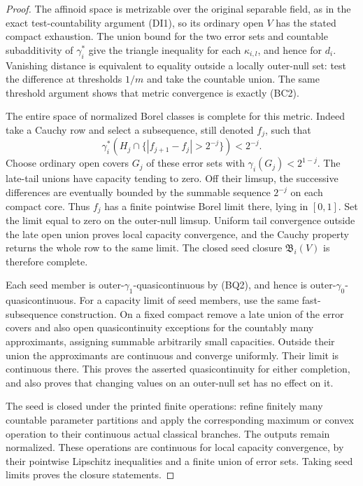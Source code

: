 \begin{proof}
The affinoid space is metrizable over the original separable
field, as in the exact test-countability argument (DI1), so its
ordinary open $V$ has the stated compact exhaustion. The union
bound for the two error sets and countable subadditivity of
$\gamma_i^*$ give the triangle inequality for each
$\kappa_{i,l}$, and hence for $d_i$. Vanishing distance is
equivalent to equality outside a locally outer-null set: test
the difference at thresholds $1/m$ and take the countable union.
The same threshold argument shows that metric convergence is
exactly (BC2).

The entire space of normalized Borel classes is complete for
this metric. Indeed take a Cauchy row and select a subsequence,
still denoted $f_j$, such that
\[
 \gamma_i^*(H_j\cap\{|f_{j+1}-f_j|>2^{-j}\})<2^{-j}.
\]
Choose ordinary open covers $G_j$ of these error sets with
$\gamma_i(G_j)<2^{1-j}$. The late-tail unions have capacity
tending to zero. Off their limsup, the successive differences
are eventually bounded by the summable sequence $2^{-j}$ on
each compact core. Thus $f_j$ has a finite pointwise Borel
limit there, lying in $[0,1]$. Set the limit equal to zero on
the outer-null limsup. Uniform tail convergence outside the
late open union proves local capacity convergence, and the
Cauchy property returns the whole row to the same limit.
The closed seed closure $\mathfrak B_i(V)$ is therefore complete.

Each seed member is outer-$\gamma_1$-quasicontinuous by (BQ2),
and hence is outer-$\gamma_0$-quasicontinuous. For a capacity
limit of seed members, use the same fast-subsequence construction.
On a fixed compact remove a late union of the error covers and
also open quasicontinuity exceptions for the countably many
approximants, assigning summable arbitrarily small capacities.
Outside their union the approximants are continuous and converge
uniformly. Their limit is continuous there. This proves the
asserted quasicontinuity for either completion, and also proves
that changing values on an outer-null set has no effect on it.

The seed is closed under the printed finite operations: refine
finitely many countable parameter partitions and apply the
corresponding maximum or convex operation to their continuous
actual classical branches. The outputs remain normalized. These
operations are continuous for local capacity convergence, by
their pointwise Lipschitz inequalities and a finite union of
error sets. Taking seed limits proves the closure statements.
\end{proof}

